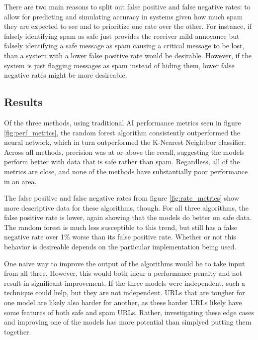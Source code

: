 There are two main reasons to split out false positive and false negative rates: to allow for predicting and simulating accuracy in systems given how much spam they are expected to see and to prioritize one rate over the other. For instance, if falsely identifying spam as safe just provides the receiver mild annoyance but falsely identifying a safe message as spam causing a critical message to be lost, than a system with a lower false positive rate would be desirable. However, if the system is just flagging messages as spam instead of hiding them, lower false negative rates might be more desireable.

\subsection{Results}

Of the three methods, using traditional AI performance metrics seen in figure \ref{fig:perf_metrics}, the random forest algorithm consistently outperformed the neural network, which in turn outperformed the K-Nearest Neightbor classifier. Across all methods, precision was at or above the recall, suggesting the models perform better with data that is safe rather than spam. Regardless, all of the metrics are close, and none of the methods have substantially poor performance in an area.

The false positive and false negative rates from figure \ref{fig:rate_metrics} show more descriptive data for these algorithms, though. For all three algorithms, the false positive rate is lower, again showing that the models do better on safe data. The random forest is much less susceptible to this trend, but still has a false negative rate over 1\% worse than its false positive rate. Whether or not this behavior is desireable depends on the particular implementation being used.

One naive way to improve the output of the algorithms would be to take input from all three. However, this would both incur a performance penalty and not result in significant improvement. If the three models were independent, such a technique could help, but they are not independent. URLs that are tougher for one model are likely also harder for another, as these harder URLs likely have some features of both safe and spam URLs. Rather, investigating these edge cases and improving one of the models has more potential than simplyed putting them together.

